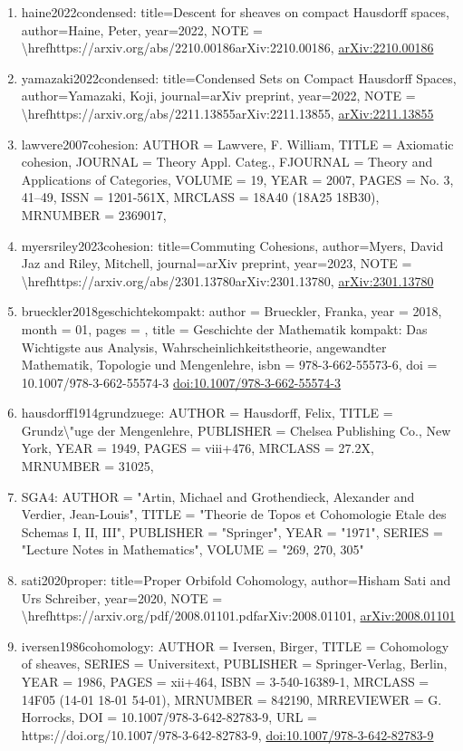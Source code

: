 \documentclass[11pt]{article}
\begin{document}
\begin{enumerate}[leftmargin=*]
  \item haine2022condensed: title=Descent for sheaves on compact Hausdorff spaces, author=Haine, Peter, year=2022, NOTE = \textbackslash{}hrefhttps://arxiv.org/abs/2210.00186arXiv:2210.00186, \href{https://arxiv.org/abs/2210.00186}{arXiv:2210.00186}
  \item yamazaki2022condensed: title=Condensed Sets on Compact Hausdorff Spaces, author=Yamazaki, Koji, journal=arXiv preprint, year=2022, NOTE = \textbackslash{}hrefhttps://arxiv.org/abs/2211.13855arXiv:2211.13855, \href{https://arxiv.org/abs/2211.13855}{arXiv:2211.13855}
  \item lawvere2007cohesion: AUTHOR = Lawvere, F. William, TITLE = Axiomatic cohesion, JOURNAL = Theory Appl. Categ., FJOURNAL = Theory and Applications of Categories, VOLUME = 19, YEAR = 2007, PAGES = No. 3, 41--49, ISSN = 1201-561X, MRCLASS = 18A40 (18A25 18B30), MRNUMBER = 2369017,
  \item myersriley2023cohesion: title=Commuting Cohesions, author=Myers, David Jaz and Riley, Mitchell, journal=arXiv preprint, year=2023, NOTE = \textbackslash{}hrefhttps://arxiv.org/abs/2301.13780arXiv:2301.13780, \href{https://arxiv.org/abs/2301.13780}{arXiv:2301.13780}
  \item brueckler2018geschichtekompakt: author = Brueckler, Franka, year = 2018, month = 01, pages = , title = Geschichte der Mathematik kompakt: Das Wichtigste aus Analysis, Wahrscheinlichkeitstheorie, angewandter Mathematik, Topologie und Mengenlehre, isbn = 978-3-662-55573-6, doi = 10.1007/978-3-662-55574-3 \href{https://doi.org/10.1007/978-3-662-55574-3}{doi:10.1007/978-3-662-55574-3}
  \item hausdorff1914grundzuege: AUTHOR = Hausdorff, Felix, TITLE = Grundz\textbackslash{}"uge der Mengenlehre, PUBLISHER = Chelsea Publishing Co., New York, YEAR = 1949, PAGES = viii+476, MRCLASS = 27.2X, MRNUMBER = 31025,
  \item SGA4: AUTHOR = "Artin, Michael and Grothendieck, Alexander and Verdier, Jean-Louis", TITLE = "Theorie de Topos et Cohomologie Etale des Schemas I, II, III", PUBLISHER = "Springer", YEAR = "1971", SERIES = "Lecture Notes in Mathematics", VOLUME = "269, 270, 305"
  \item sati2020proper: title=Proper Orbifold Cohomology, author=Hisham Sati and Urs Schreiber, year=2020, NOTE = \textbackslash{}hrefhttps://arxiv.org/pdf/2008.01101.pdfarXiv:2008.01101, \href{https://arxiv.org/abs/2008.01101}{arXiv:2008.01101}
  \item iversen1986cohomology: AUTHOR = Iversen, Birger, TITLE = Cohomology of sheaves, SERIES = Universitext, PUBLISHER = Springer-Verlag, Berlin, YEAR = 1986, PAGES = xii+464, ISBN = 3-540-16389-1, MRCLASS = 14F05 (14-01 18-01 54-01), MRNUMBER = 842190, MRREVIEWER = G. Horrocks, DOI = 10.1007/978-3-642-82783-9, URL = https://doi.org/10.1007/978-3-642-82783-9, \href{https://doi.org/10.1007/978-3-642-82783-9}{doi:10.1007/978-3-642-82783-9}

\end{enumerate}
\end{document}
